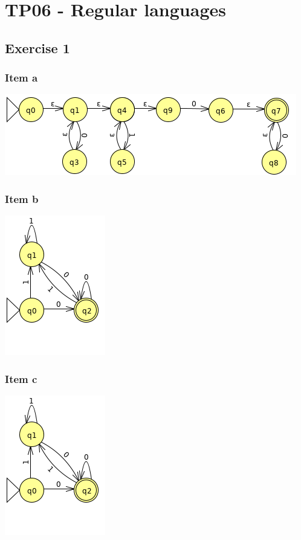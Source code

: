 \documentclass[docid=TP06]{tcom_TP}
\begin{document}
\setcounter{section}{5}
\section{TP06 - Regular languages}
{
\renewcommand{\thesubsubsection}{\thesubsection\alph{subsubsection}}
\subsection{Exercise 1}
\subsubsection{Item a}
\begin{center} \includegraphics[scale=0.5]{TP06_1_a} \end{center}
\subsubsection{Item b}
\begin{center} \includegraphics[scale=0.5]{TP06_1_b} \end{center}
\subsubsection{Item c}
\begin{center} \includegraphics[scale=0.5]{TP06_1_b} \end{center}
}
\end{document}
